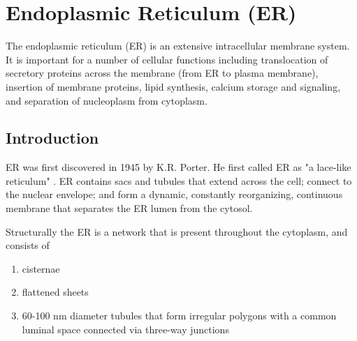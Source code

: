 \chapter{Endoplasmic Reticulum (ER)}
\label{chap:ER}

The endoplasmic reticulum (ER) is an extensive intracellular membrane system.
It is important for a number of cellular functions including translocation of
secretory proteins across the membrane (from ER to plasma membrane), insertion
of membrane proteins, lipid synthesis, calcium storage and signaling, and
separation of nucleoplasm from cytoplasm.

\section{Introduction}

ER was first discovered in 1945 by K.R. Porter. He first called ER as "a
lace-like reticulum" \citep{porter1945}. ER contains sacs and tubules that
extend across the cell; connect to the nuclear envelope; and form a dynamic,
constantly reorganizing, continuous membrane that separates the ER lumen from
the cytosol.


Structurally the ER is a network that is present throughout the cytoplasm, and
consists of
\begin{enumerate}
  \item cisternae
  
  \item flattened sheets
  
  \item 60-100 nm diameter tubules that form  
  irregular polygons with a common luminal space connected via three-way
  junctions
\end{enumerate}

